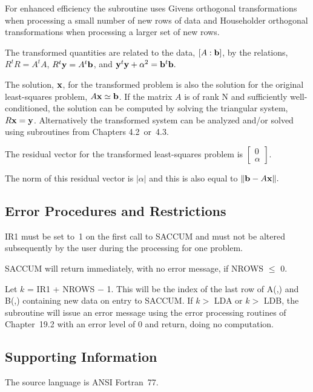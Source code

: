 \documentclass[twoside]{MATH77}
\begin{document}
For enhanced efficiency the subroutine uses Givens orthogonal
transformations when processing a small number of new rows of data and
Householder orthogonal transformations when processing a larger set of new
rows.

The transformed quantities are related to the data, $[A:{\bf b}]$, by the
relations, $R^tR = A^tA$, $R^t{\bf y} = A^t{\bf b}$, and ${\bf y}^t{\bf y} +
\alpha ^2 = {\bf b}^t{\bf b}.$

The solution, ${\bf x}$, for the transformed problem is also the solution
for the original least-squares problem, $A{\bf x} \simeq {\bf b}$. If the
matrix $A$ is of rank N and sufficiently well-conditioned, the solution can
be computed by solving the triangular system, $R{\bf x} = {\bf y}$.
Alternatively the transformed system can be analyzed and/or solved using
subroutines from Chapters 4.2~or~4.3.

The residual vector for the transformed least-squares problem is $\left[
\begin{array}{c}
0 \\
\alpha
\end{array}
\right] $.

The norm of this residual vector is $|\alpha |$ and this is also equal to $\|%
{\bf b} - A{\bf x}\|.$





\subsection{Error Procedures and Restrictions}

IR1 must be set to~1 on the first call to SACCUM and must not be altered
subsequently by the user during the processing for one problem.

SACCUM will return immediately, with no error message, if NROWS $\leq $ 0.

Let $k$ = IR1 + NROWS $-$ 1. This will be the index of the last row of A(,)
and B(,) containing new data on entry to SACCUM. If $k >$ LDA or $k >$ LDB,
the subroutine will issue an error message using the error processing
routines of Chapter~19.2 with an error level of 0 and return, doing no
computation.

\subsection{Supporting Information}

The source language is ANSI Fortran~77.
\end{document}
